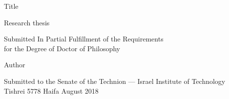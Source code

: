 \begin{center}

{\Huge Title}


{\Large Research thesis}


\parbox{30em}{
\begin{center}
Submitted In Partial Fulfillment of the Requirements
\\
for the Degree of Doctor of Philosophy
\end{center}
}


{\huge Author}


\parbox{32em}{
\begin{center}
Submitted to the Senate of the Technion --- Israel Institute of Technology
\\
Tishrei 5778 \hfill Haifa \hfill August 2018
\end{center}
}

\end{center}